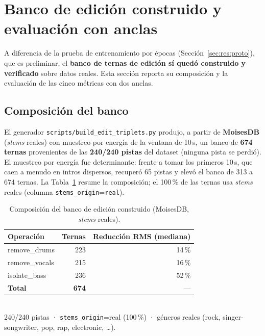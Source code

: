 
\section{Banco de edición construido y evaluación con anclas}
\label{sec:res:edicion}

A diferencia de la prueba de entrenamiento por épocas (Sección~\ref{sec:res:proto}),
que es preliminar, el \textbf{banco de ternas de edición sí quedó construido y
verificado} sobre datos reales. Esta sección reporta su composición y la
evaluación de las cinco métricas con dos anclas.

\subsection{Composición del banco}
\label{sec:res:edicion:banco}

El generador \texttt{scripts/build\_edit\_triplets.py} produjo, a partir de
\textbf{MoisesDB} (\textit{stems} reales) con muestreo por energía de la ventana
de 10\,s, un banco de \textbf{674 ternas} provenientes de las
\textbf{240/240 pistas} del dataset (ninguna pista se perdió). El muestreo por
energía fue determinante: frente a tomar los primeros 10\,s, que caen a menudo en
intros dispersos, recuperó 65 pistas y elevó el banco de 313 a 674 ternas.
La Tabla~\ref{tab:res-banco} resume la composición; el 100\,\% de las ternas usa
\textit{stems} reales (columna \texttt{stems\_origin}=\texttt{real}).

\begin{table}[t]
  \caption{Composición del banco de edición construido (MoisesDB, \textit{stems} reales).}
  \label{tab:res-banco}
  \centering
  \begin{tabular}{lrr}
    \hline
    \textbf{Operación} & \textbf{Ternas} & \textbf{Reducción RMS (mediana)} \\
    \hline
    remove\_drums  & 223 & 14\,\% \\
    remove\_vocals & 215 & 16\,\% \\
    isolate\_bass  & 236 & 52\,\% \\
    \hline
    \textbf{Total} & \textbf{674} & --- \\
    \hline
  \end{tabular}
  \smallskip\\
  \footnotesize{240/240 pistas · \texttt{stems\_origin}=real (100\,\%) ·
  géneros reales (rock, singer-songwriter, pop, rap, electronic, …).}
\end{table}


